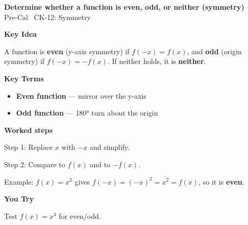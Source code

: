 \documentclass[12pt]{article}
\begin{document}
\begin{center}{\Large \textbf{Determine whether a function is even, odd, or neither (symmetry)}}\\[2pt]{\small Pre-Cal \textbar\ CK-12: Symmetry}\end{center}\vspace{0.25cm}

{\large\textbf{Key Idea}}\par\smallskip
A function is \textbf{even} (y-axis symmetry) if $f(-x)=f(x)$, and \textbf{odd} (origin symmetry) if $f(-x)=-f(x)$. If neither holds, it is \textbf{neither}.\par


{\large\textbf{Key Terms}}\par\smallskip
\begin{itemize}[leftmargin=1.4em]
  \item \textbf{Even function} — mirror over the y-axis
  \item \textbf{Odd function} — 180° turn about the origin
\end{itemize}


{\large\textbf{Worked steps}}\par\smallskip
Step 1: Replace $x$ with $-x$ and simplify.\par
Step 2: Compare to $f(x)$ and to $-f(x)$.\par
Example: $f(x)=x^2$ gives $f(-x)=(-x)^2=x^2=f(x)$, so it is \textbf{even}.\par


{\large\textbf{You Try}}\par\smallskip
Test $f(x)=x^3$ for even/odd.\par
\end{document}
